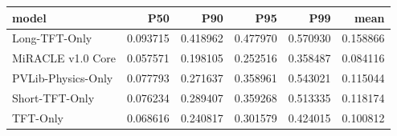 \begin{tabular}{lrrrrr}
\toprule
model & P50 & P90 & P95 & P99 & mean \\
\midrule
Long-TFT-Only & 0.093715 & 0.418962 & 0.477970 & 0.570930 & 0.158866 \\
MiRACLE v1.0 Core & 0.057571 & 0.198105 & 0.252516 & 0.358487 & 0.084116 \\
PVLib-Physics-Only & 0.077793 & 0.271637 & 0.358961 & 0.543021 & 0.115044 \\
Short-TFT-Only & 0.076234 & 0.289407 & 0.359268 & 0.513335 & 0.118174 \\
TFT-Only & 0.068616 & 0.240817 & 0.301579 & 0.424015 & 0.100812 \\
\bottomrule
\end{tabular}
